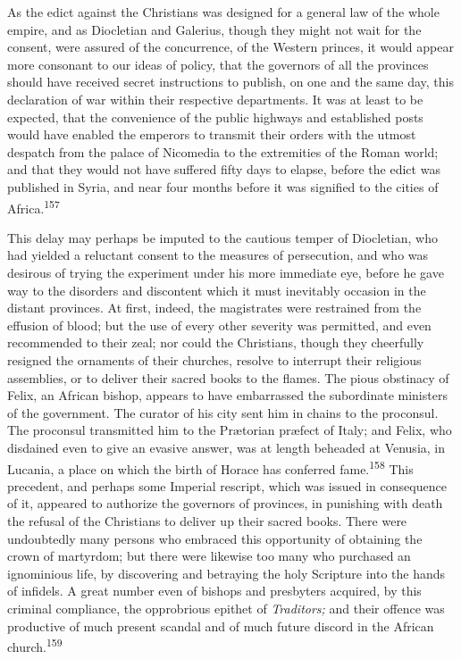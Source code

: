 As the edict against the Christians was designed for a general
law of the whole empire, and as Diocletian and Galerius, though
they might not wait for the consent, were assured of the
concurrence, of the Western princes, it would appear more
consonant to our ideas of policy, that the governors of all the
provinces should have received secret instructions to publish, on
one and the same day, this declaration of war within their
respective departments. It was at least to be expected, that the
convenience of the public highways and established posts would
have enabled the emperors to transmit their orders with the
utmost despatch from the palace of Nicomedia to the extremities
of the Roman world; and that they would not have suffered fifty
days to elapse, before the edict was published in Syria, and near
four months before it was signified to the cities of Africa.\textsuperscript{157}

This delay may perhaps be imputed to the cautious temper of
Diocletian, who had yielded a reluctant consent to the measures
of persecution, and who was desirous of trying the experiment
under his more immediate eye, before he gave way to the disorders
and discontent which it must inevitably occasion in the distant
provinces. At first, indeed, the magistrates were restrained from
the effusion of blood; but the use of every other severity was
permitted, and even recommended to their zeal; nor could the
Christians, though they cheerfully resigned the ornaments of
their churches, resolve to interrupt their religious assemblies,
or to deliver their sacred books to the flames. The pious
obstinacy of Felix, an African bishop, appears to have
embarrassed the subordinate ministers of the government. The
curator of his city sent him in chains to the proconsul. The
proconsul transmitted him to the Prætorian præfect of Italy; and
Felix, who disdained even to give an evasive answer, was at
length beheaded at Venusia, in Lucania, a place on which the
birth of Horace has conferred fame.\textsuperscript{158} This precedent, and
perhaps some Imperial rescript, which was issued in consequence
of it, appeared to authorize the governors of provinces, in
punishing with death the refusal of the Christians to deliver up
their sacred books. There were undoubtedly many persons who
embraced this opportunity of obtaining the crown of martyrdom;
but there were likewise too many who purchased an ignominious
life, by discovering and betraying the holy Scripture into the
hands of infidels. A great number even of bishops and presbyters
acquired, by this criminal compliance, the opprobrious epithet of
\textit{Traditors;} and their offence was productive of much present
scandal and of much future discord in the African church.\textsuperscript{159}

